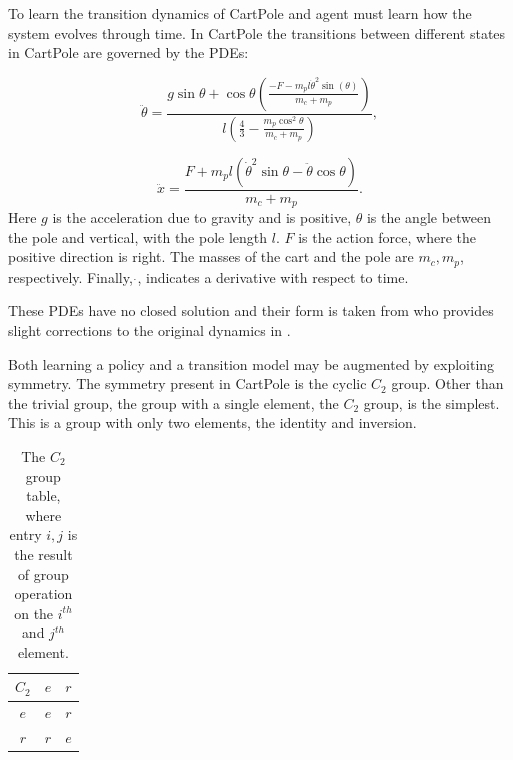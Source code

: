 To learn the transition dynamics of CartPole and agent must learn how the system evolves through time. In CartPole the transitions between different states in CartPole are governed by the PDEs:

\begin{equation}
	\ddot{\theta} = \frac{g \sin \theta + \cos\theta \left({\frac{-F - m_p l \dot{\theta}^2 \sin(\theta)}{m_c + m_p}} \right )}{l\left ( \frac{4}{3} - \frac{m_p \cos^2 \theta}{m_c + m_p}\right)},
\end{equation}

\begin{equation}
	\ddot{x} = \frac{ F + m_p l (\dot{\theta}^2 \sin \theta - \ddot{\theta} \cos \theta)}{m_c + m_p}.
\end{equation}
Here $g$ is the acceleration due to gravity and is positive, $\theta$ is the angle between the pole and vertical, with the pole length $l$. $F$ is the action force, where the positive direction is right. The masses of the cart and the pole are $m_c, m_p$, respectively. Finally, $\dot{}$, indicates a derivative with respect to time.

These PDEs have no closed solution and their form is taken from \cite{florian2007correct} who provides slight corrections to the original dynamics in \cite{barto1983neuronlike}.

Both learning a policy and a transition model may be augmented by exploiting symmetry. The symmetry present in CartPole is the cyclic $C_2$ group. Other than the trivial group, the group with a single element, the $C_2$ group, is the simplest. This is a group with only two elements, the identity and inversion.
\begin{table}[h]
	\begin{center}
		\begin{tabular}{c | c  c}
			$C_2$ & $e$ & $r$ \\
			\hline
			$e$   & $e$ & $r$ \\
			$r$   & $r$ & $e$ \\
		\end{tabular}
		\caption{The $C_2$ group table, where entry $i, j$ is the result of group operation on the $i^{th}$ and $j^{th}$ element.}
		\label{tab:cyclic_two}
	\end{center}
\end{table}



